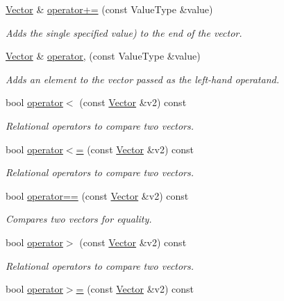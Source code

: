 \begin{DoxyCompactItemize}
\mbox{\hyperlink{classVector}{Vector}} \& \mbox{\hyperlink{classVector_afded71b2a6d6df8b0257cbfd8f7e8d5f}{operator+=}} (const Value\+Type \&value)
\begin{DoxyCompactList}\small\item\em Adds the single specified value) to the end of the vector. \end{DoxyCompactList}\item 
\mbox{\hyperlink{classVector}{Vector}} \& \mbox{\hyperlink{classVector_ad2a2f86bb5857209608bbbfe1066c650}{operator,}} (const Value\+Type \&value)
\begin{DoxyCompactList}\small\item\em Adds an element to the vector passed as the left-\/hand operatand. \end{DoxyCompactList}\item 
bool \mbox{\hyperlink{classVector_a77901fd042b59d646be1da79b8339c5c}{operator$<$}} (const \mbox{\hyperlink{classVector}{Vector}} \&v2) const
\begin{DoxyCompactList}\small\item\em Relational operators to compare two vectors. \end{DoxyCompactList}\item 
bool \mbox{\hyperlink{classVector_ae70337b6c4c49dde850031de8b68c05d}{operator$<$=}} (const \mbox{\hyperlink{classVector}{Vector}} \&v2) const
\begin{DoxyCompactList}\small\item\em Relational operators to compare two vectors. \end{DoxyCompactList}\item 
bool \mbox{\hyperlink{classVector_a31eebc4de791cf62b8fa12a0eeca90dc}{operator==}} (const \mbox{\hyperlink{classVector}{Vector}} \&v2) const
\begin{DoxyCompactList}\small\item\em Compares two vectors for equality. \end{DoxyCompactList}\item 
bool \mbox{\hyperlink{classVector_a0b8b14442cb420ffaecc0606345e73a1}{operator$>$}} (const \mbox{\hyperlink{classVector}{Vector}} \&v2) const
\begin{DoxyCompactList}\small\item\em Relational operators to compare two vectors. \end{DoxyCompactList}\item 
bool \mbox{\hyperlink{classVector_adaa095641c5fc43f90754d7694784006}{operator$>$=}} (const \mbox{\hyperlink{classVector}{Vector}} \&v2) const

\end{DoxyCompactItemize}
